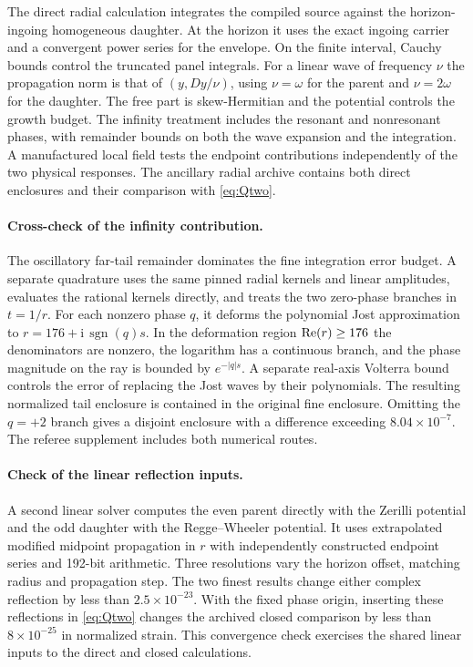 \documentclass[11pt]{article}
\newcommand{\ii}{\mathrm{i}}
\begin{document}
The direct radial calculation integrates the compiled source against the horizon-ingoing homogeneous daughter.
At the horizon it uses the exact ingoing carrier and a convergent power series for the envelope.
On the finite interval, Cauchy bounds control the truncated panel integrals.
For a linear wave of frequency \(\nu\) the propagation norm is that of \((y,Dy/\nu)\), using \(\nu=\omega\) for the parent and \(\nu=2\omega\) for the daughter. The free part is skew-Hermitian and the potential controls the growth budget.
The infinity treatment includes the resonant and nonresonant phases, with remainder bounds on both the wave expansion and the integration.
A manufactured local field tests the endpoint contributions independently of the two physical responses.
The ancillary radial archive contains both direct enclosures and their comparison with \eqref{eq:Qtwo}.

\paragraph{Cross-check of the infinity contribution.}
The oscillatory far-tail remainder dominates the fine integration error budget.
A separate quadrature uses the same pinned radial kernels and linear amplitudes, evaluates the rational kernels directly, and treats the two zero-phase branches in \(t=1/r\).
For each nonzero phase \(q\), it deforms the polynomial Jost approximation to \(r=176+\ii\,\operatorname{sgn}(q)s\).
In the deformation region \({\rm Re}(r)\ge 176\) the denominators are nonzero, the logarithm has a continuous branch, and the phase magnitude on the ray is bounded by \(e^{-|q|s}\).
A separate real-axis Volterra bound controls the error of replacing the Jost waves by their polynomials.
The resulting normalized tail enclosure is contained in the original fine enclosure.
Omitting the \(q=+2\) branch gives a disjoint enclosure with a difference exceeding \(8.04\times10^{-7}\).
The referee supplement includes both numerical routes.

\paragraph{Check of the linear reflection inputs.}
A second linear solver computes the even parent directly with the Zerilli potential and the odd daughter with the Regge--Wheeler potential.
It uses extrapolated modified midpoint propagation in \(r\) with independently constructed endpoint series and 192-bit arithmetic.
Three resolutions vary the horizon offset, matching radius and propagation step.
The two finest results change either complex reflection by less than \(2.5\times10^{-23}\).
With the fixed phase origin, inserting these reflections in \eqref{eq:Qtwo} changes the archived closed comparison by less than \(8\times10^{-25}\) in normalized strain.
This convergence check exercises the shared linear inputs to the direct and closed calculations.
\end{document}
